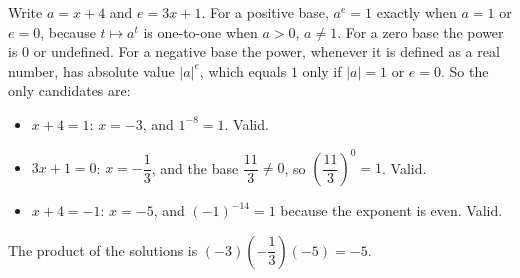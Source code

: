 Write $a=x+4$ and $e=3x+1$. For a positive base, $a^e=1$ exactly when $a=1$ or $e=0$, because $t\mapsto a^t$ is one-to-one when $a>0$, $a\ne1$. For a zero base the power is $0$ or undefined. For a negative base the power, whenever it is defined as a real number, has absolute value $|a|^e$, which equals $1$ only if $|a|=1$ or $e=0$. So the only candidates are:
\begin{itemize}
\item $x+4=1$: $x=-3$, and $1^{-8}=1$. Valid.
\item $3x+1=0$: $x=-\dfrac{1}{3}$, and the base $\dfrac{11}{3}\ne0$, so $\left(\dfrac{11}{3}\right)^0=1$. Valid.
\item $x+4=-1$: $x=-5$, and $(-1)^{-14}=1$ because the exponent is even. Valid.
\end{itemize}
The product of the solutions is $(-3)\left(-\dfrac{1}{3}\right)(-5)=\boxed{-5}$.
